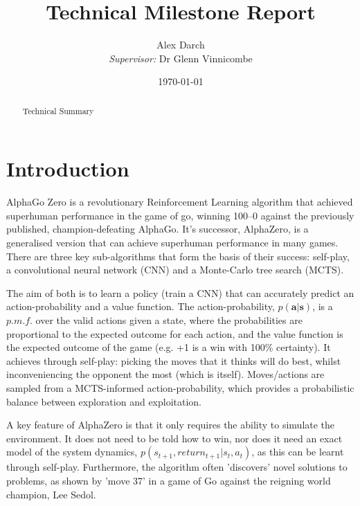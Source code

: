 \documentclass[12pt]{article}
\author{Alex Darch \\
   \textit{Supervisor:} Dr Glenn Vinnicombe}
\title{Technical Milestone Report}
\date{\today}
\begin{document}
%

\maketitle

\renewcommand{\abstractname}{Summary}
\begin{abstract}
Technical Summary \newline \newline \newline \newline \newline \\
\end{abstract}


\section{Introduction}

AlphaGo Zero is a revolutionary Reinforcement Learning algorithm that achieved superhuman performance in the game of go, winning 100–0 against the previously published, champion-defeating AlphaGo. It's successor, AlphaZero, is a generalised version that can achieve superhuman performance in many games. There are three key sub-algorithms that form the basis of their success: self-play, a convolutional neural network (CNN) and a Monte-Carlo tree search (MCTS). 

The aim of both is to learn a policy (train a CNN) that can accurately predict an action-probability and a value function. The action-probability, $p(\boldsymbol{a}|\boldsymbol{s})$, is a $p.m.f.$ over the valid actions given a state, where the probabilities are proportional to the expected outcome for each action, and the value function is the expected outcome of the game (e.g. +1 is a win with 100\% certainty). It achieves through self-play: picking the moves that it thinks will do best, whilst inconveniencing the opponent the most (which is itself). Moves/actions are sampled from a MCTS-informed action-probability, which provides a probabilistic balance between exploration and exploitation. 

A key feature of AlphaZero is that it only requires the ability to simulate the environment. It does not need to be told how to win, nor does it need an exact model of the system dynamics, $p(s_{t+1}, return_{t+1} |s_t, a_t)$, as this can be learnt through self-play. Furthermore, the algorithm often 'discovers' novel solutions to problems, as shown by 'move 37' in a game of Go against the reigning world champion, Lee Sedol.
\end{document}
